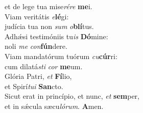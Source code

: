 \oddverse et de lege tua mise\textit{ré}\textit{re} \textbf{me}i.\\
\evenverse Viam veritátis \textit{e}\textbf{lé}gi:~\*\\
\evenverse judícia tua non \textit{sum} \textit{o}\textbf{blí}tus.\\
\oddverse Adhǽsi testimóniis tu\textit{is} \textbf{Dó}mine:~\*\\
\oddverse noli \textit{me} \textit{con}\textbf{fún}dere.\\
\evenverse Viam mandatórum tuórum \textit{cu}\textbf{cúr}ri:~\*\\
\evenverse cum dilatá\textit{sti} \textit{cor} \textbf{me}um.\\
\oddverse Glória Patri, \textit{et} \textbf{Fí}lio,~\*\\
\oddverse et Spirí\textit{tu}\textit{i} \textbf{San}cto.\\
\evenverse Sicut erat in princípio, et nunc, \textit{et} \textbf{sem}per,~\*\\
\evenverse et in sǽcula sæcu\textit{ló}\textit{rum}. \textbf{A}men.\\
